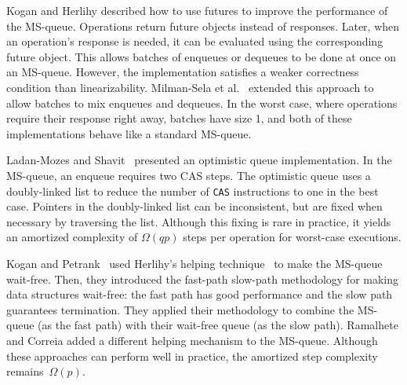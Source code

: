 Kogan and Herlihy \cite{DBLP:conf/podc/KoganH14} described how to use futures to improve
the performance of the MS-queue.
Operations return future
objects instead of responses. Later, when an operation's response is needed, it
can be evaluated using the corresponding future object.
This allows batches of enqueues or dequeues to be done at once on an MS-queue.
However, the implementation satisfies a weaker correctness condition than linearizability.
Milman-Sela et al.~\cite{MKLLP22} extended this approach to allow batches
to mix enqueues and dequeues.
In the worst case, where operations require their response right away,
batches have size 1, and both of these implementations behave like a standard MS-queue.

Ladan-Mozes and Shavit~\cite{DBLP:journals/dc/Ladan-MozesS08}
presented an optimistic  queue implementation. 
In the MS-queue, an enqueue requires two CAS steps.
The optimistic queue uses a doubly-linked list to reduce the number of
\texttt{CAS} instructions to one in the best case. 
Pointers in the doubly-linked list can be inconsistent, but are fixed when necessary by traversing the list.
Although this fixing is rare in practice, it yields an amortized complexity of $\Omega(qp)$ 
steps per operation for worst-case executions.

Kogan and Petrank~\cite{DBLP:conf/ppopp/KoganP11} 
used Herlihy's helping
technique~\cite{10.1145/114005.102808} to make the MS-queue
wait-free.
Then, they introduced the 
fast-path slow-path methodology \cite{10.1145/2370036.2145835} for making data structures wait-free:
the fast path has good performance and the slow path guarantees termination.
They applied their methodology to combine the MS-queue (as the fast path)
with their wait-free queue (as the slow path).
Ramalhete and Correia \cite{RC17} added a different helping mechanism to the MS-queue.
Although these approaches can perform well in practice,
the amortized step complexity remains~$\Omega(p)$. 

